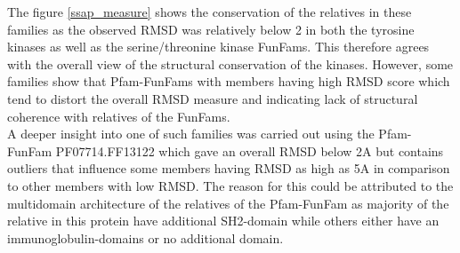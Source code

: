 \documentclass[a4paper, 11pt]{article}
\begin{document}
The figure \ref{ssap_measure} shows the conservation of the relatives in these families as the observed RMSD was relatively below 2 in both the tyrosine kinases as well as the serine/threonine kinase FunFams. This therefore agrees with the overall view of the structural conservation of the kinases. However, some families show that Pfam-FunFams with members having high RMSD score which tend to distort the overall RMSD measure and indicating lack of structural coherence with relatives of the FunFams.\\
A deeper insight into one of such families was carried out using the Pfam-FunFam PF07714.FF13122 which gave an overall RMSD below 2A but contains outliers that influence some members having RMSD as high as 5A in comparison to other members with low RMSD. The reason for this could be attributed to the multidomain architecture of the relatives of the Pfam-FunFam as majority of the relative in this protein have additional SH2-domain  while others either have an immunoglobulin-domains or no additional domain.
\end{document}
